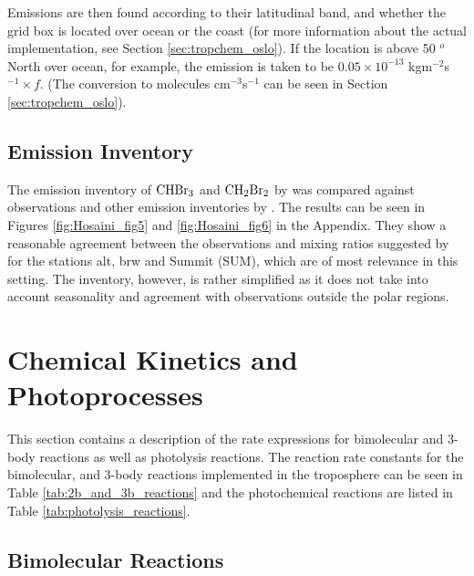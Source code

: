 Emissions are then found according to their latitudinal band, and whether the grid box is located over ocean or the coast (for more information about the actual implementation, see Section \ref{sec:tropchem_oslo}). If the location is above 50 $^o$ North over ocean, for example, the emission is taken to be $0.05\times10^{-13}$ kgm$^{-2}$s$^{-1}\times f$. (The conversion to molecules cm$^{-3}$s$^{-1}$ can be seen in Section \ref{sec:tropchem_oslo}). 


\subsection{Emission Inventory}

The emission inventory of $\mathrm{CHBr_3}$ and $\mathrm{CH_2Br_2}$ by \cite{Liang2010} was compared against observations and other emission inventories by \cite{Hossaini2013}. The results can be seen in Figures \ref{fig:Hosaini_fig5} and \ref{fig:Hosaini_fig6} in the Appendix. They show a reasonable agreement between the observations and mixing ratios suggested by \cite{Liang2010} for the stations \acrfull{alt}, \acrfull{brw} and Summit (SUM), which are of most relevance in this setting. The inventory, however, is rather simplified as it does not take into account seasonality and agreement with observations outside the polar regions. 





\section{Chemical Kinetics and Photoprocesses}\label{sec:chem_kinetics}

This section contains a description of the rate expressions for bimolecular and 3-body reactions as well as photolysis reactions. The reaction rate constants for the bimolecular, and 3-body reactions implemented in the troposphere can be seen in Table \ref{tab:2b_and_3b_reactions} and the photochemical reactions are listed in Table \ref{tab:photolysis_reactions}.






\subsection{Bimolecular Reactions}\label{sec:bimolecular_reactions}


